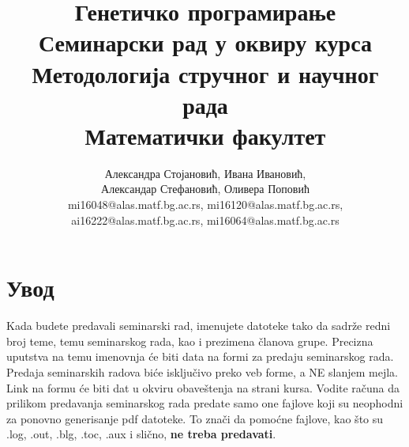 \documentclass[a4paper]{article}
\begin{document}
\title{Генетичко програмирање\\ \small{Семинарски рад у оквиру курса\\Методологија стручног и научног рада\\ Математички факултет}}

\author{Александра Стојановић, Ивана Ивановић,\\ Александар Стефановић, Оливера Поповић\\ mi16048@alas.matf.bg.ac.rs, mi16120@alas.matf.bg.ac.rs,\\ ai16222@alas.matf.bg.ac.rs, mi16064@alas.matf.bg.ac.rs}


\maketitle


\tableofcontents

\newpage

\section{Увод}
\label{sec:uvod}



Kada budete predavali seminarski rad, imenujete datoteke tako da sadrže redni broj teme, temu seminarskog rada, kao i prezimena članova grupe. Precizna uputstva na temu imenovnja će biti data na formi za predaju seminarskog rada. Predaja seminarskih radova biće isključivo preko veb forme, a NE slanjem mejla. Link na formu će biti dat u okviru obaveštenja na strani kursa. Vodite računa da prilikom predavanja seminarskog rada predate samo one fajlove koji su neophodni za ponovno generisanje pdf datoteke. To znači da pomoćne fajlove, kao što su .log, .out, .blg, .toc, .aux i slično, \textbf{ne treba predavati}.
\end{document}

